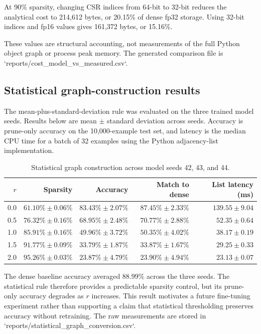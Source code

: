\documentclass[11pt]{article}
\begin{document}
At 90\% sparsity, changing CSR indices from 64-bit to 32-bit reduces the
analytical cost to 214,612 bytes, or 20.15\% of dense fp32 storage.  Using
32-bit indices and fp16 values gives 161,372 bytes, or 15.16\%.

These values are structural accounting, not measurements of the full Python
object graph or process peak memory.  The generated comparison file is
`reports/cost_model_vs_measured.csv`.

\subsection{Statistical graph-construction results}

The mean-plus-standard-deviation rule was evaluated on the three trained model
seeds.  Results below are mean $\pm$ standard deviation across seeds.  Accuracy
is prune-only accuracy on the 10,000-example test set, and latency is the
median CPU time for a batch of 32 examples using the Python adjacency-list
implementation.

\begin{table}[ht]
\centering
\caption{Statistical graph construction across model seeds 42, 43, and 44.}
\label{tab:statistical}
\small
\begin{tabular}{rrrrr}
\toprule
$r$ & Sparsity & Accuracy & Match to dense & List latency (ms) \\
\midrule
0.0 & $61.10\%\pm0.06\%$ & $83.43\%\pm2.07\%$ & $87.45\%\pm2.33\%$ & $139.55\pm9.04$ \\
0.5 & $76.32\%\pm0.16\%$ & $68.95\%\pm2.48\%$ & $70.77\%\pm2.88\%$ & $52.35\pm0.64$ \\
1.0 & $85.91\%\pm0.16\%$ & $49.96\%\pm3.72\%$ & $50.35\%\pm4.02\%$ & $38.17\pm0.19$ \\
1.5 & $91.77\%\pm0.09\%$ & $33.79\%\pm1.87\%$ & $33.87\%\pm1.67\%$ & $29.25\pm0.33$ \\
2.0 & $95.26\%\pm0.03\%$ & $23.87\%\pm4.79\%$ & $23.90\%\pm4.94\%$ & $23.13\pm0.07$ \\
\bottomrule
\end{tabular}
\end{table}

The dense baseline accuracy averaged $88.99\%$ across the three seeds.  The
statistical rule therefore provides a predictable sparsity control, but its
prune-only accuracy degrades as $r$ increases.  This result motivates a future
fine-tuning experiment rather than supporting a claim that statistical
thresholding preserves accuracy without retraining.  The raw measurements are
stored in `reports/statistical_graph_conversion.csv`.
\end{document}
